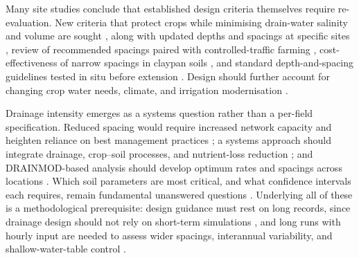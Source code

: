 Many site studies conclude that established design criteria themselves require
re-evaluation. New criteria that protect crops while minimising drain-water
salinity and volume are sought \parencite{Christen2001}, along with updated
depths and spacings at specific sites
\parencite{Muhammad2021,Malota2016,Bahçeci2009,Kahlown2002}, review of
recommended spacings paired with controlled-traffic farming
\parencite{Mante2022,Mante2018}, cost-effectiveness of narrow spacings in
claypan soils \parencite{Nelson2017}, and standard depth-and-spacing guidelines
tested in situ before extension \parencite{HajAmor2019}. Design should further
account for changing crop water needs, climate, and irrigation modernisation
\parencite{Rui2024,Akram2013,Ziaeifar2025,Ritzema2023,Ritzema2007,Ritzema2006,Ritzema2011}.

Drainage intensity emerges as a systems question rather than a per-field
specification. Reduced spacing would require increased network capacity and
heighten reliance on best management practices
\parencite{Singh2009,Dialameh2025}; a systems approach should integrate
drainage, crop--soil processes, and nutrient-loss reduction
\parencite{Castellano2019}; and DRAINMOD-based analysis should develop optimum
rates and spacings across locations \parencite{Strock2011}. Which soil
parameters are most critical, and what confidence intervals each requires,
remain fundamental unanswered questions
\parencite{Ayars2015,SHIRMOHAMMADI1995,HARDJOAMIDJOJO1982}. Underlying all of
these is a methodological prerequisite: design guidance must rest on long
records, since drainage design should not rely on short-term simulations
\parencite{Wang2006b}, and long runs with hourly input are needed to assess
wider spacings, interannual variability, and shallow-water-table control
\parencite{Ale2009,Häggblom2019,Malota2015,Salo2019,Kladivko2023,Chang2012}.